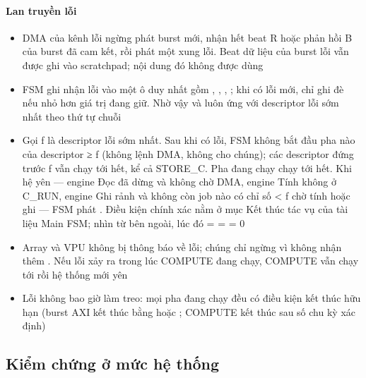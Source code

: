 \paragraph{Lan truyền lỗi}\label{par:6-5}
\begin{itemize}
\item DMA của kênh lỗi ngừng phát burst mới, nhận hết beat R hoặc phản hồi B của burst đã cam kết, rồi phát một xung lỗi. Beat dữ liệu của burst lỗi vẫn được ghi vào scratchpad; nội dung đó không được dùng
\item FSM ghi nhận lỗi vào một ô duy nhất gồm , , , ; khi có lỗi mới, chỉ ghi đè nếu  nhỏ hơn giá trị đang giữ. Nhờ vậy  và  luôn ứng với descriptor lỗi sớm nhất theo thứ tự chuỗi
\item Gọi f là descriptor lỗi sớm nhất. Sau khi có lỗi, FSM không bắt đầu pha nào của descriptor ≥ f (không lệnh DMA, không  cho chúng); các descriptor đứng trước f vẫn chạy tới hết, kể cả STORE\_C. Pha đang chạy chạy tới hết. Khi hệ yên — engine Đọc đã dừng và không chờ DMA, engine Tính không ở C\_RUN, engine Ghi rảnh và không còn job nào có chỉ số < f chờ tính hoặc ghi — FSM phát . Điều kiện chính xác nằm ở mục Kết thúc tác vụ của tài liệu Main FSM; nhìn từ bên ngoài, lúc đó  =  =  = 0
\item Array và VPU không bị thông báo về lỗi; chúng chỉ ngừng vì không nhận thêm . Nếu lỗi xảy ra trong lúc COMPUTE đang chạy, COMPUTE vẫn chạy tới  rồi hệ thống mới yên
\item Lỗi không bao giờ làm treo: mọi pha đang chạy đều có điều kiện kết thúc hữu hạn (burst AXI kết thúc bằng  hoặc ; COMPUTE kết thúc sau số chu kỳ xác định)
\end{itemize}

\subsection{Kiểm chứng ở mức hệ thống}\label{sec:6.5}

